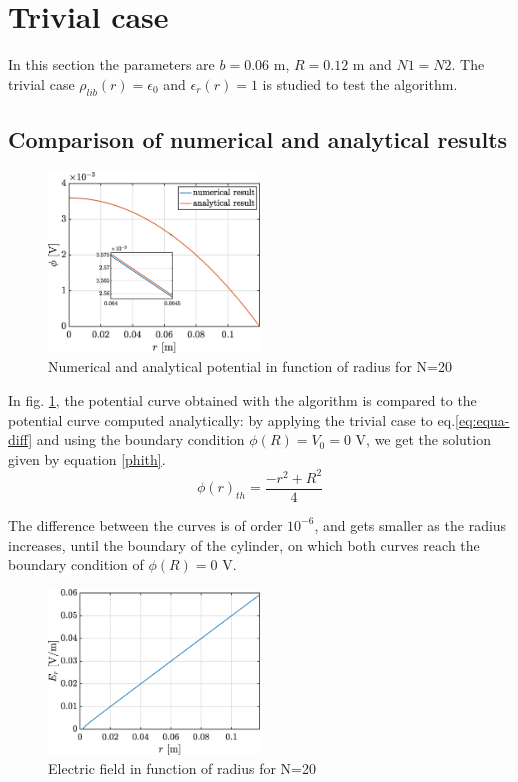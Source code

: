 \documentclass[a4paper,12pt,twoside]{article}
\begin{document}
  \section{Trivial case}

  In this section the parameters are $b=0.06$ m, $R=0.12$ m and $N1=N2$. The trivial case $\rho_{lib}(r)=\epsilon_0$ and $\epsilon_r(r)=1$ is studied to test the algorithm.

  \subsection{Comparison of numerical and analytical results}

  \begin{figure}[h!]
   \centering
   \includegraphics[width=0.5\textwidth]{graphs/c_phi.eps}
   \caption{Numerical and analytical potential in function of radius for N=20}
   \label{cphi}
  \end{figure}

  In fig. \ref{cphi}, the potential curve obtained with the algorithm is compared to the potential curve computed analytically: by applying the trivial case to eq.\eqref{eq:equa-diff} and using the boundary condition $\phi(R)=V_0=0$ V, we get the solution given by equation \eqref{phith}.
  \begin{equation}
   \phi(r)_{th} = \frac{-r^2+R^2}{4}
   \label{phith}
  \end{equation}

  The difference between the curves is of order $10^{-6}$, and gets smaller as the radius increases, until the boundary of the cylinder, on which both curves reach the boundary condition of $\phi(R)=0$ V.

  \begin{figure}[h!]
   \centering
   \includegraphics[width=0.5\textwidth]{graphs/c_Er.eps}
   \caption{Electric field in function of radius for N=20}
   \label{cEr}
  \end{figure}
\end{document}
